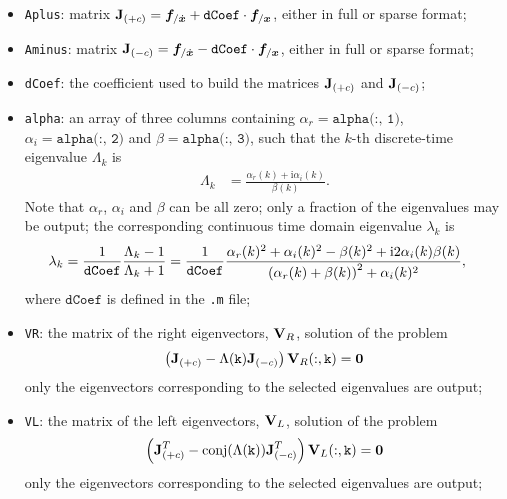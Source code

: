 \begin{itemize}
\item \texttt{Aplus}: 
matrix
$\bm{\mathbf J}_{(+c)} = \boldsymbol{f}_{/\dot{\boldsymbol{x}}} + \texttt{dCoef} \cdot \boldsymbol{f}_{/\boldsymbol{x}}$,
either in full or sparse format;

\item \texttt{Aminus}: 
matrix
$\bm{\mathbf J}_{(-c)} = \boldsymbol{f}_{/\dot{\boldsymbol{x}}} - \texttt{dCoef} \cdot \boldsymbol{f}_{/\boldsymbol{x}}$,
either in full or sparse format;

\item \texttt{dCoef}: the coefficient used to build the matrices
$\bm{\mathbf J}_{(+c)}$ and $\bm{\mathbf J}_{(-c)}$;

\item \texttt{alpha}:
an array of three columns containing
$\alpha_r = \texttt{alpha(:, 1)}$,
$\alpha_i = \texttt{alpha(:, 2)}$
and $\beta = \texttt{alpha(:, 3)}$,
such that the $k$-th discrete-time eigenvalue $\Lambda_k$ is
\begin{align}
	\Lambda_k
	&=
	\frac{\alpha_r(k) + \text{i} \alpha_i(k)}{\beta(k)}
	.
\end{align}
Note that $\alpha_r$, $\alpha_i$ and $\beta$ can be all zero;
only a fraction of the eigenvalues may be output;
the corresponding continuous time domain eigenvalue $\lambda_k$ is
\begin{align}
        \label{sec:PROBLEMS:eigenvalues}
	\lambda_k
	&=
	\frac{1}{\texttt{dCoef}}
	\frac{\Lambda_k - 1}{\Lambda_k + 1}
	=
	\frac{1}{\texttt{dCoef}}
	\frac{
		\alpha_r(k)^2
		+
		\alpha_i(k)^2
		-
		\beta(k)^2
		+
		\text{i} 2 \alpha_i(k) \beta(k)
	}{
		\left( \alpha_r(k) + \beta(k) \right)^2 + \alpha_i(k)^2
	}
	,
\end{align}
where $\texttt{dCoef}$ is defined in the \texttt{.m} file;

\item \texttt{VR}: the matrix of the right eigenvectors, $\bm{\mathbf V}_R$, solution of the problem
\begin{align*}
	\left( \bm{\mathbf J}_{(+c)} - \Lambda(\mathtt{k}) \bm{\mathbf J}_{(-c)} \right) \bm{\mathbf V}_R(:,\mathtt{k}) = \boldsymbol{0}
\end{align*}
only the eigenvectors corresponding to the selected eigenvalues are output;

\item \texttt{VL}: the matrix of the left eigenvectors, $\bm{\mathbf V}_L$, solution of the problem
\begin{align*}
	\left( \bm{\mathbf J}_{(+c)}^T - \mathrm{conj}(\Lambda(\mathtt{k})) \bm{\mathbf J}_{(-c)}^T \right) \bm{\mathbf V}_L(:, \mathtt{k}) = \boldsymbol{0}
\end{align*}
only the eigenvectors corresponding to the selected eigenvalues are output;


\end{itemize}
